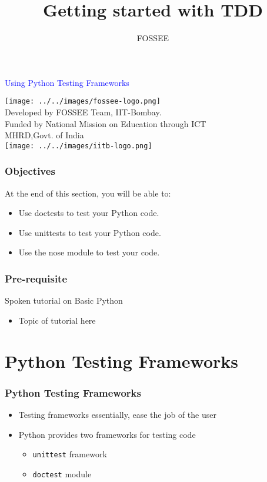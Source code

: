 \documentclass[12pt,presentation]{beamer}
\title{Getting started with TDD}
\author{FOSSEE}
\institute{IIT Bombay}
\begin{document}
\begin{frame}

\begin{center}
\vspace{12pt}
\textcolor{blue}{\huge Using Python Testing Frameworks}
\end{center}
\vspace{18pt}
\begin{center}
\vspace{10pt}
\texttt{[image: ../../images/fossee-logo.png]}\\
\vspace{5pt}
\scriptsize Developed by FOSSEE Team, IIT-Bombay. \\ 
\scriptsize Funded by National Mission on Education through ICT\\
\scriptsize  MHRD,Govt. of India\\
\texttt{[image: ../../images/iitb-logo.png]}\\
\end{center}
\end{frame}


\begin{frame}
  \frametitle{Objectives}
  At the end of this section, you will be able to:
  \begin{itemize}
  \item Use doctests to test your Python code.
  \item Use unittests to test your Python code.
  \item Use the nose module to test your code.
  \end{itemize}
\end{frame}

\begin{frame}
\frametitle{Pre-requisite}
\label{sec-3}

Spoken tutorial on Basic Python
\begin{itemize}
\item Topic of tutorial here
\end{itemize}
\end{frame}


\section{Python Testing Frameworks}

\begin{frame}[fragile]
  \frametitle{Python Testing Frameworks}
  \begin{itemize}
  \item Testing frameworks essentially, ease the job of the user
  \item Python provides two frameworks for testing code
    \begin{itemize}
    \item \texttt{unittest} framework
    \item \texttt{doctest} module
    \end{itemize}
  \end{itemize}
\end{frame}
\end{document}

